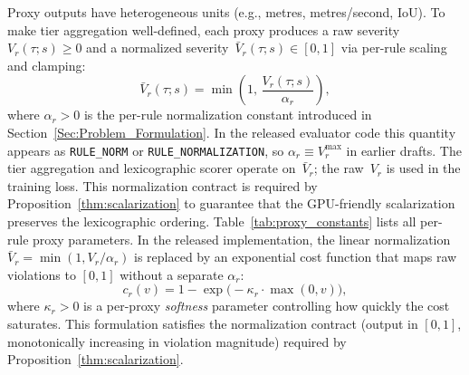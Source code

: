 Proxy outputs have heterogeneous units (e.g., metres, metres/second, IoU). To make tier aggregation well-defined, each proxy produces a raw severity~$V_r(\tau;s)\ge 0$ and a normalized severity~$\bar{V}_r(\tau;s)\in[0,1]$ via per-rule scaling and clamping:
\begin{equation}
\bar{V}_r(\tau;s)=\min\!\left(1,\,\frac{V_r(\tau;s)}{\alpha_r}\right),
\end{equation}
where $\alpha_r{>}0$ is the per-rule normalization constant introduced in Section~\ref{Sec:Problem_Formulation}.  In the released evaluator code this quantity appears as \texttt{RULE\_NORM} or \texttt{RULE\_NORMALIZATION}, so $\alpha_r \equiv V_r^{\max}$ in earlier drafts.  The tier aggregation and lexicographic scorer operate on~$\bar{V}_r$; the raw~$V_r$ is used in the training loss. This normalization contract is required by Proposition~\ref{thm:scalarization} to guarantee that the GPU-friendly scalarization preserves the lexicographic ordering.  Table~\ref{tab:proxy_constants} lists all per-rule proxy parameters.  In the released implementation, the linear normalization $\bar{V}_r = \min(1, V_r/\alpha_r)$ is replaced by an exponential cost function that maps raw violations to $[0,1]$ without a separate $\alpha_r$:
\begin{equation}
c_r(v) = 1 - \exp\!\bigl(-\kappa_r \cdot \max(0, v)\bigr),
\label{eq:exponential_cost}
\end{equation}
where $\kappa_r > 0$ is a per-proxy \emph{softness} parameter controlling how quickly the cost saturates.  This formulation satisfies the normalization contract (output in $[0,1]$, monotonically increasing in violation magnitude) required by Proposition~\ref{thm:scalarization}.

